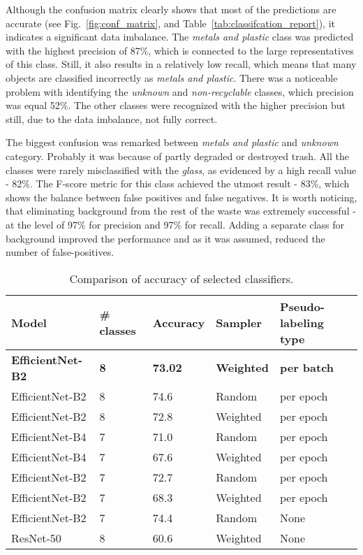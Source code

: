 \documentclass{article}
\begin{document}
Although the confusion matrix clearly shows that most of the predictions are accurate (see Fig.~\ref{fig:conf_matrix}, and Table~\ref{tab:classifcation_report}), it indicates a significant data imbalance. The \textit{metals and plastic} class was predicted with the highest precision of 87\%, which is connected to the large representatives of this class. Still, it also results in a relatively low recall, which means that many objects are classified incorrectly as \textit{metals and plastic}. There was a noticeable problem with identifying the \textit{unknown} and \textit{non-recyclable} classes, which precision was equal 52\%. The other classes were recognized with the higher precision but still, due to the data imbalance, not fully correct.

The biggest confusion was remarked between \textit{metals and plastic} and \textit{unknown} category. Probably it was because of partly degraded or destroyed trash. All the classes were rarely misclassified with the \textit{glass}, as evidenced by a high recall value - 82\%. The F-score metric for this class achieved the utmost result - 83\%, which shows the balance between false positives and false negatives. It is worth noticing, that eliminating background from the rest of the waste was extremely successful - at the level of 97\% for precision and 97\% for recall. Adding a separate class for background improved the performance and as it was assumed, reduced the number of false-positives.

{
\begin{table}[!hbt]
\centering
\caption{Comparison of accuracy of selected classifiers.}
\label{tab:classifiers_comp}
\begin{tabular}{lllll}
    \hline
        \textbf{Model} & \textbf{\# classes} & \textbf{Accuracy} & \textbf{Sampler} & \textbf{Pseudo-labeling type} \\ \hline
        \textbf{EfficientNet-B2} & \textbf{8} & \textbf{73.02} & \textbf{Weighted} & \textbf{per batch} \\
        EfficientNet-B2 & 8 & 74.6 & Random & per epoch \\
        EfficientNet-B2 & 8 & 72.8 & Weighted & per epoch \\
        EfficientNet-B4 & 7 & 71.0 & Random & per epoch \\
        EfficientNet-B4 & 7 & 67.6 & Weighted & per epoch \\
        EfficientNet-B2 & 7 & 72.7 & Random & per epoch \\
        EfficientNet-B2 & 7 & 68.3 & Weighted & per epoch \\
        EfficientNet-B2 & 7 & 74.4 & Random & None \\
        ResNet-50 & 8 & 60.6 & Weighted & None \\ \hline
    \end{tabular}
\end{table}
}
\end{document}
